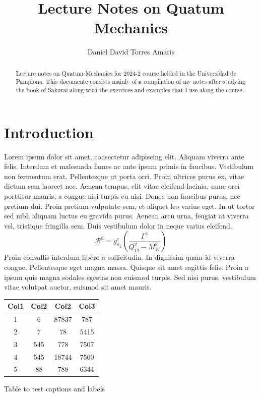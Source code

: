 \documentclass{article}
\title{Lecture Notes on Quatum Mechanics}
\author{Daniel David Torres Amaris}
\begin{document}
\begin{titlepage}
\thispagestyle{empty}
\maketitle

\begin{abstract}
Lecture notes on Quatum Mechanics for 2024-2 course helded in the Universidad de Pamplona. This documente consists mainly of a compilation of my notes after studying the book of Sakurai along with the exercices and examples that I use along the course.
\end{abstract}

\tableofcontents
\end{titlepage}



\section{Introduction}
Lorem ipsum dolor sit amet, consectetur adipiscing elit. Aliquam viverra ante felis. Interdum et malesuada fames ac ante ipsum primis in faucibus. Vestibulum non fermentum erat. Pellentesque ut porta orci. Proin ultrices purus ex, vitae dictum sem laoreet nec. Aenean tempus, elit vitae eleifend lacinia, nunc orci porttitor mauris, a congue nisi turpis eu nisi. Donec non faucibus purus, nec pretium dui. Proin pretium vulputate sem, et aliquet leo varius eget. In ut tortor sed nibh aliquam luctus eu gravida purus. Aenean arcu urna, feugiat at viverra vel, tristique fringilla sem. Duis vestibulum dolor in neque varius eleifend. 
\begin{equation}
\mathcal{R}^{\text{d}} = g^e_{\sigma_{2}}\left(\frac{\Gamma^z}{Q_{12}^2-M_W^2}\right)
\end{equation}
Proin convallis interdum libero a sollicitudin. In dignissim quam id viverra congue. Pellentesque eget magna massa. Quisque sit amet sagittis felis. Proin a ipsum quis magna sodales egestas non euismod turpis. Sed nisi purus, vestibulum vitae volutpat auctor, euismod sit amet mauris. 

\begin{margintable}
\centering
\begin{tabular}{||c c c c||} 
 \hline
 Col1 & Col2 & Col2 & Col3 \\ [0.5ex] 
 \hline\hline
 1 & 6 & 87837 & 787 \\ 
 2 & 7 & 78 & 5415 \\
 3 & 545 & 778 & 7507 \\
 4 & 545 & 18744 & 7560 \\
 5 & 88 & 788 & 6344 \\ [1ex] 
 \hline
\end{tabular}
\captionsetup{justification=centering}
\caption{Table to test captions and labels}
\end{margintable}
\end{document}
